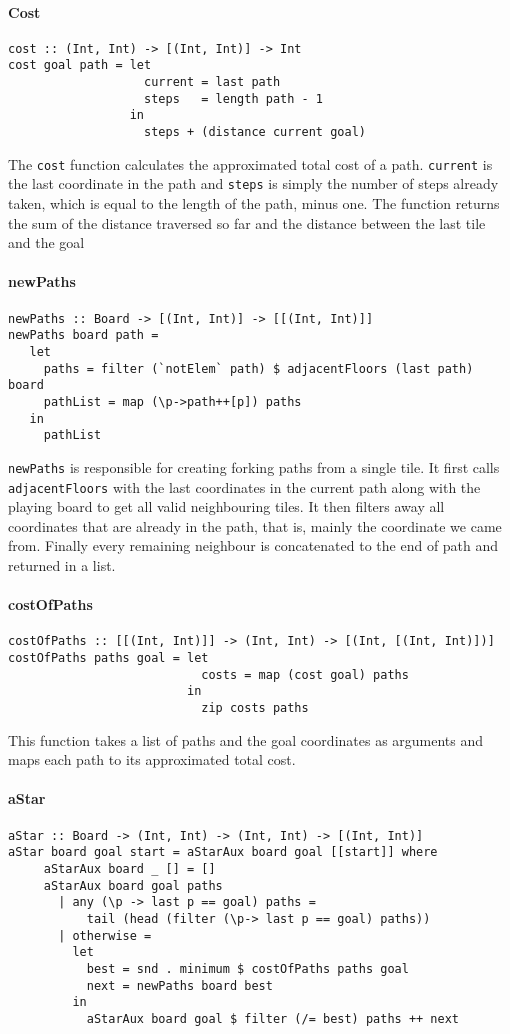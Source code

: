 \documentclass{article}
\begin{document}
        \paragraph{Cost}
   \begin{verbatim}
cost :: (Int, Int) -> [(Int, Int)] -> Int
cost goal path = let
                   current = last path
                   steps   = length path - 1
                 in
                   steps + (distance current goal)
   \end{verbatim}
The \texttt{cost} function calculates the approximated total cost of a path. \texttt{current} is the last coordinate in the path and \texttt{steps} is simply the number of steps already taken, which is equal to the length of the path, minus one. The function returns the sum of the distance traversed so far and the distance between the last tile and the goal
\paragraph{newPaths}
\begin{verbatim}
newPaths :: Board -> [(Int, Int)] -> [[(Int, Int)]]
newPaths board path =
   let
     paths = filter (`notElem` path) $ adjacentFloors (last path) board
     pathList = map (\p->path++[p]) paths
   in
     pathList
\end{verbatim}
\texttt{newPaths} is responsible for creating forking paths from a single tile. It first calls \texttt{adjacentFloors} with the last coordinates in the current path along with the playing board to get all valid neighbouring tiles. It then filters away all coordinates that are already in the path, that is, mainly the coordinate we came from. Finally every remaining neighbour is concatenated to the end of path and returned in a list.

\paragraph{costOfPaths}
   \begin{verbatim}
costOfPaths :: [[(Int, Int)]] -> (Int, Int) -> [(Int, [(Int, Int)])]
costOfPaths paths goal = let
                           costs = map (cost goal) paths
                         in
                           zip costs paths
   \end{verbatim}
This function takes a list of paths and the goal coordinates as arguments and maps each path to its approximated total cost.
        \paragraph{aStar}
           \begin{verbatim}
aStar :: Board -> (Int, Int) -> (Int, Int) -> [(Int, Int)]
aStar board goal start = aStarAux board goal [[start]] where
     aStarAux board _ [] = []
     aStarAux board goal paths
       | any (\p -> last p == goal) paths =
           tail (head (filter (\p-> last p == goal) paths))
       | otherwise =
         let
           best = snd . minimum $ costOfPaths paths goal
           next = newPaths board best
         in
           aStarAux board goal $ filter (/= best) paths ++ next
 \end{verbatim}
\end{document}
